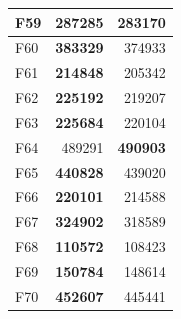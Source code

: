 \begin{table}[]
\begin{tabular}{lrr|}
\multicolumn{1}{|l|}{\cellcolor[HTML]{FCE6AB}F59} & \multicolumn{1}{r|}{\cellcolor[HTML]{D3FFB6}\textbf{287285}}  & 283170                                                    \\ \hline
\multicolumn{1}{|l|}{\cellcolor[HTML]{FCE6AB}F60} & \multicolumn{1}{r|}{\cellcolor[HTML]{D3FFB6}\textbf{383329}}  & 374933                                                    \\ \hline
\multicolumn{1}{|l|}{\cellcolor[HTML]{FCE6AB}F61} & \multicolumn{1}{r|}{\cellcolor[HTML]{D3FFB6}\textbf{214848}}  & 205342                                                    \\ \hline
\multicolumn{1}{|l|}{\cellcolor[HTML]{FCE6AB}F62} & \multicolumn{1}{r|}{\cellcolor[HTML]{D3FFB6}\textbf{225192}}  & 219207                                                    \\ \hline
\multicolumn{1}{|l|}{\cellcolor[HTML]{FCE6AB}F63} & \multicolumn{1}{r|}{\cellcolor[HTML]{D3FFB6}\textbf{225684}}  & 220104                                                    \\ \hline
\multicolumn{1}{|l|}{\cellcolor[HTML]{FCE6AB}F64} & \multicolumn{1}{r|}{489291}                                   & \cellcolor[HTML]{D3FFB6}\textbf{490903}                   \\ \hline
\multicolumn{1}{|l|}{\cellcolor[HTML]{FCE6AB}F65} & \multicolumn{1}{r|}{\cellcolor[HTML]{D3FFB6}\textbf{440828}}  & 439020                                                    \\ \hline
\multicolumn{1}{|l|}{\cellcolor[HTML]{FCE6AB}F66} & \multicolumn{1}{r|}{\cellcolor[HTML]{D3FFB6}\textbf{220101}}  & 214588                                                    \\ \hline
\multicolumn{1}{|l|}{\cellcolor[HTML]{FCE6AB}F67} & \multicolumn{1}{r|}{\cellcolor[HTML]{D3FFB6}\textbf{324902}}  & 318589                                                    \\ \hline
\multicolumn{1}{|l|}{\cellcolor[HTML]{FCE6AB}F68} & \multicolumn{1}{r|}{\cellcolor[HTML]{D3FFB6}\textbf{110572}}  & 108423                                                    \\ \hline
\multicolumn{1}{|l|}{\cellcolor[HTML]{FCE6AB}F69} & \multicolumn{1}{r|}{\cellcolor[HTML]{D3FFB6}\textbf{150784}}  & 148614                                                    \\ \hline
\multicolumn{1}{|l|}{\cellcolor[HTML]{FCE6AB}F70} & \multicolumn{1}{r|}{\cellcolor[HTML]{D3FFB6}\textbf{452607}}  & 445441                                                    \\ \hline

\end{tabular}
\end{table}
